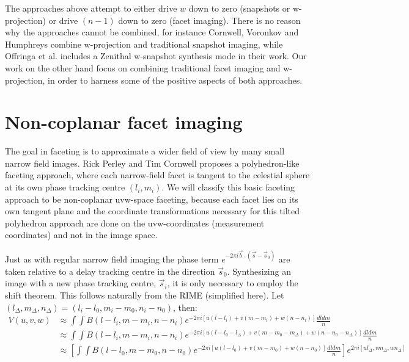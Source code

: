 The approaches above attempt to either drive $w$ down to zero (snapshots or w-projection) or drive $(n-1)$ down to zero (facet imaging). There is no reason why
the approaches cannot be combined, for instance Cornwell, Voronkov and Humphreys \cite{cornwell2012wide} combine w-projection and traditional snapshot imaging, while
Offringa et al. includes a Zenithal w-snapshot synthesis mode in their work. Our work on the other hand focus on combining traditional facet imaging and w-projection, 
in order to harness some of the positive aspects of both approaches.

\section{Non-coplanar facet imaging}
The goal in faceting is to approximate a wider field of view by many small narrow field images. Rick Perley and Tim Cornwell \cite{cornwell1992radio} proposes a 
polyhedron-like faceting approach, where each narrow-field facet is tangent to the celestial sphere at its own phase tracking centre $(l_i,m_i)$. We will classify
this basic faceting approach to be non-coplanar uvw-space faceting, because each facet lies on its own tangent plane and the coordinate transformations
necessary for this tilted polyhedron approach are done on the uvw-coordinates (measurement coordinates) and not in the image space.

Just as with regular narrow field imaging the phase term $e^{-2\pi i \vec{b}\cdot(\vec{s}-\vec{s}_0)}$ are taken relative to a delay tracking centre in the direction
$\vec{s}_0$. Synthesizing an image with a new phase tracking centre, $\vec{s}_i$, it is only necessary to employ the shift theorem. This follows naturally from the
RIME (simplified here). Let $(l_\Delta,m_\Delta,n_\Delta) = (l_i-l_0,m_i-m_0,n_i-n_0)$, then:
\begin{equation}
  \label{eqn_faceting}
  \begin{split}
    V(u,v,w)&\approx\int{\int{B(l-l_i,m-m_i,n-n_i)e^{-2{\pi}i[u(l-l_i)+v(m-m_i)+w(n-n_i)]}\frac{dldm}{n}}}\\
    &\approx\int{\int{B(l-l_i,m-m_i,n-n_i)e^{-2{\pi}i[u(l-l_0-l_\Delta)+v(m-m_0-m_\Delta)+w(n-n_0-n_\Delta)]}\frac{dldm}{n}}}\\
    &\approx\left[\int{\int{B(l-l_0,m-m_0,n-n_0)e^{-2{\pi}i[u(l-l_0)+v(m-m_0)+w(n-n_0)]}\frac{dldm}{n}}}\right]e^{2{\pi}i[ul_\Delta,vm_\Delta,wn_\Delta]}\\
  \end{split}
\end{equation}

